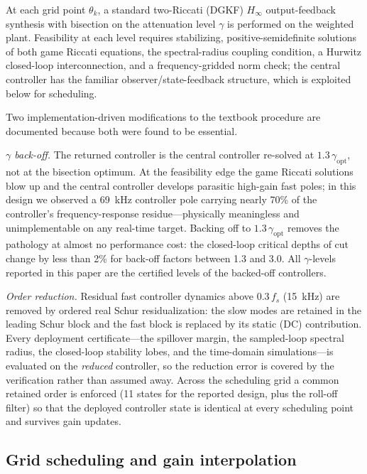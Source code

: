 \documentclass[preprint,12pt]{elsarticle}
\newcommand{\hinf}{H_\infty}
\begin{document}
At each grid point $\theta_k$, a standard two-Riccati (DGKF) $\hinf$
output-feedback synthesis \cite{doyle1989state} with bisection on the
attenuation level $\gamma$ is performed on the weighted plant.
Feasibility at each level requires stabilizing, positive-semidefinite
solutions of both game Riccati equations, the spectral-radius coupling
condition, a Hurwitz closed-loop interconnection, and a
frequency-gridded norm check; the central controller has the familiar
observer/state-feedback structure, which is exploited below for
scheduling.

Two implementation-driven modifications to the textbook procedure are
documented because both were found to be essential.

\emph{$\gamma$ back-off.} The returned controller is the central
controller re-solved at $1.3\, \gamma_{\mathrm{opt}}$, not at the
bisection optimum. At the feasibility edge the game Riccati solutions
blow up and the central controller develops parasitic high-gain fast
poles; in this design we observed a 69~kHz controller pole carrying
nearly 70\% of the controller's frequency-response residue---physically
meaningless and unimplementable on any real-time target. Backing off to
$1.3\, \gamma_{\mathrm{opt}}$ removes the pathology at almost no
performance cost: the closed-loop critical depths of cut change by less
than 2\% for back-off factors between 1.3 and 3.0. All $\gamma$-levels
reported in this paper are the certified levels of the backed-off
controllers.

\emph{Order reduction.} Residual fast controller dynamics above
$0.3\, f_s$ (15~kHz) are removed by ordered real Schur residualization:
the slow modes are retained in the leading Schur block and the fast
block is replaced by its static (DC) contribution. Every deployment
certificate---the spillover margin, the sampled-loop spectral radius,
the closed-loop stability lobes, and the time-domain simulations---is
evaluated on the \emph{reduced} controller, so the reduction error is
covered by the verification rather than assumed away. Across the
scheduling grid a common retained order is enforced (11 states for the
reported design, plus the roll-off filter) so that the deployed
controller state is identical at every scheduling point and survives
gain updates.

\subsection{Grid scheduling and gain interpolation}
\label{sec:grid}
\end{document}
